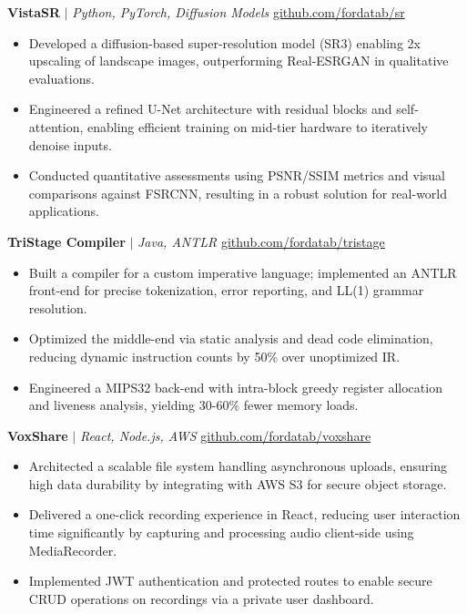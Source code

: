 \documentclass[11pt]{article}
\begin{document}
\textbf{VistaSR} $|$ \emph{Python, PyTorch, Diffusion Models} \hfill \href{https://github.com/fordatab/sr}{github.com/fordatab/sr}
\vspace{-2pt}
\begin{itemize}
    \item Developed a diffusion-based super-resolution model (SR3) enabling 2x upscaling of landscape images, outperforming Real-ESRGAN in qualitative evaluations.
    \item Engineered a refined U-Net architecture with residual blocks and self-attention, enabling efficient training on mid-tier hardware to iteratively denoise inputs.
    \item Conducted quantitative assessments using PSNR/SSIM metrics and visual comparisons against FSRCNN, resulting in a robust solution for real-world applications.
\end{itemize}
\vspace{4pt} 

\textbf{TriStage Compiler} $|$ \emph{Java, ANTLR} \hfill \href{https://github.com/fordatab/tristage}{github.com/fordatab/tristage}
\vspace{-2pt}
\begin{itemize}
    \item Built a compiler for a custom imperative language; implemented an ANTLR front-end for precise tokenization, error reporting, and LL(1) grammar resolution.
    \item Optimized the middle-end via static analysis and dead code elimination, reducing dynamic instruction counts by 50\% over unoptimized IR.
    \item Engineered a MIPS32 back-end with intra-block greedy register allocation and liveness analysis, yielding 30-60\% fewer memory loads.
\end{itemize}
\vspace{4pt} 

\textbf{VoxShare} $|$ \emph{React, Node.js, AWS} \hfill \href{https://github.com/fordatab/voxshare}{github.com/fordatab/voxshare}
\vspace{-2pt}
\begin{itemize}
    \item Architected a scalable file system handling asynchronous uploads, ensuring high data durability by integrating with AWS S3 for secure object storage.
    \item Delivered a one-click recording experience in React, reducing user interaction time significantly by capturing and processing audio client-side using MediaRecorder.
    \item Implemented JWT authentication and protected routes to enable secure CRUD operations on recordings via a private user dashboard.
\end{itemize}
\vspace{-12pt}
\end{document}
